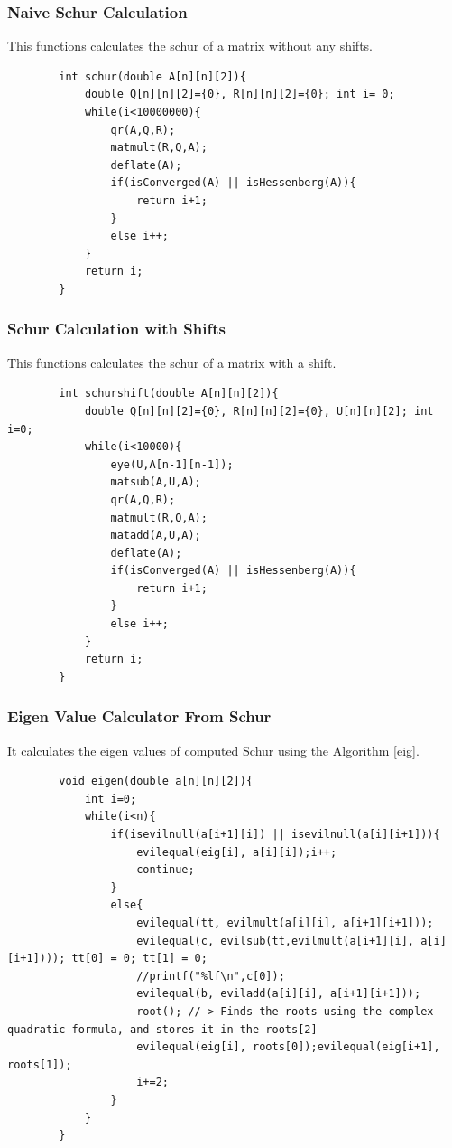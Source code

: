 \documentclass[12pt]{article}
\begin{document}
	\subsubsection{Naive Schur Calculation}
	This functions calculates the schur of a matrix without any shifts.
	\begin{lstlisting}
		int schur(double A[n][n][2]){
			double Q[n][n][2]={0}, R[n][n][2]={0}; int i= 0;
			while(i<10000000){
				qr(A,Q,R);
				matmult(R,Q,A);
				deflate(A);
				if(isConverged(A) || isHessenberg(A)){
					return i+1;
				}
				else i++;
			}
			return i;
		}
	\end{lstlisting}
	\subsubsection{Schur Calculation with Shifts}
	This functions calculates the schur of a matrix with a shift.
	\begin{lstlisting}
		int schurshift(double A[n][n][2]){
			double Q[n][n][2]={0}, R[n][n][2]={0}, U[n][n][2]; int i=0;
			while(i<10000){
				eye(U,A[n-1][n-1]);
				matsub(A,U,A);
				qr(A,Q,R);
				matmult(R,Q,A);
				matadd(A,U,A);
				deflate(A);
				if(isConverged(A) || isHessenberg(A)){
					return i+1;
				}
				else i++;
			}
			return i;
		}
	\end{lstlisting}
	\subsubsection{Eigen Value Calculator From Schur}
	It calculates the eigen values of computed Schur using the Algorithm \ref{eig}.
	\begin{lstlisting}
		void eigen(double a[n][n][2]){
			int i=0;
			while(i<n){
				if(isevilnull(a[i+1][i]) || isevilnull(a[i][i+1])){
					evilequal(eig[i], a[i][i]);i++;
					continue;
				}
				else{
					evilequal(tt, evilmult(a[i][i], a[i+1][i+1]));
					evilequal(c, evilsub(tt,evilmult(a[i+1][i], a[i][i+1]))); tt[0] = 0; tt[1] = 0;
					//printf("%lf\n",c[0]);
					evilequal(b, eviladd(a[i][i], a[i+1][i+1]));
					root(); //-> Finds the roots using the complex quadratic formula, and stores it in the roots[2]
					evilequal(eig[i], roots[0]);evilequal(eig[i+1], roots[1]);
					i+=2;
				}
			}
		}
	\end{lstlisting}
\end{document}
